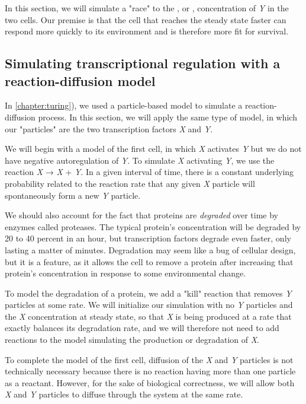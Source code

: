In this section, we will simulate a "race" to the , or , concentration of \textit{Y} in the two cells. Our premise is that the cell that reaches the steady state faster can respond more quickly to its environment and is therefore more fit for survival.

\FloatBarrier
{}
\subsection{Simulating transcriptional regulation with a reaction-diffusion model}

In \autoref{chapter:turing}), we used a particle-based model to simulate a reaction-diffusion process. In this section, we will apply the same type of model, in which our "particles" are the two transcription factors \textit{X} and \textit{Y}.

We will begin with a model of the first cell, in which \textit{X} activates \textit{Y} but we do not have negative autoregulation of \textit{Y}. To simulate \textit{X} activating \textit{Y}, we use the reaction \textit{X} → \textit{X} + \textit{Y}. In a given interval of time, there is a constant underlying probability related to the reaction rate that any given \textit{X} particle will spontaneously form a new \textit{Y} particle.

We should also account for the fact that proteins are \textit{degraded} over time by enzymes called proteases. The typical protein's concentration will be degraded by 20 to 40 percent in an hour, but transcription factors degrade even faster, only lasting a matter of minutes. Degradation may seem like a bug of cellular design, but it is a feature, as it allows the cell to remove a protein after increasing that protein's concentration in response to some environmental change.

To model the degradation of a protein, we add a "kill" reaction that removes \textit{Y} particles at some rate. We will initialize our simulation with no \textit{Y} particles and the \textit{X} concentration at steady state, so that \textit{X} is being produced at a rate that exactly balances its degradation rate, and we will therefore not need to add reactions to the model simulating the production or degradation of \textit{X}.

To complete the model of the first cell, diffusion of the \textit{X} and \textit{Y} particles is not technically necessary because there is no reaction having more than one particle as a reactant. However, for the sake of biological correctness, we will allow both \textit{X} and \textit{Y} particles to diffuse through the system at the same rate.

